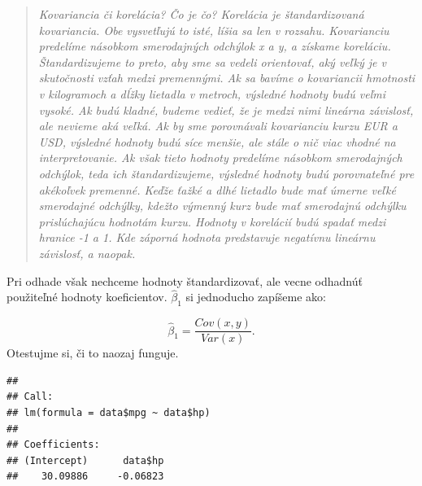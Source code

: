 \begin{quote}
\emph{Kovariancia či korelácia? Čo je čo? Korelácia je štandardizovaná
kovariancia. Obe vysvetľujú to isté, líšia sa len v rozsahu. Kovarianciu
predelíme násobkom smerodajných odchýlok x a y, a získame koreláciu.
Štandardizujeme to preto, aby sme sa vedeli orientovať, aký veľký je v
skutočnosti vzťah medzi premennými. Ak sa bavíme o kovariancii hmotnosti
v kilogramoch a dĺžky lietadla v metroch, výsledné hodnoty budú veľmi
vysoké. Ak budú kladné, budeme vedieť, že je medzi nimi lineárna
závislosť, ale nevieme aká veľká. Ak by sme porovnávali kovarianciu
kurzu EUR a USD, výsledné hodnoty budú síce menšie, ale stále o nič viac
vhodné na interpretovanie. Ak však tieto hodnoty predelíme násobkom
smerodajných odchýlok, teda ich štandardizujeme, výsledné hodnoty budú
porovnateľné pre akékoľvek premenné. Keďže ťažké a dlhé lietadlo bude
mať úmerne veľké smerodajné odchýlky, kdežto výmenný kurz bude mať
smerodajnú odchýlku prislúchajúcu hodnotám kurzu. Hodnoty v korelácií
budú spadať medzi hranice -1 a 1. Kde záporná hodnota predstavuje
negatívnu lineárnu závislosť, a naopak.}
\end{quote}

Pri odhade však nechceme hodnoty štandardizovať, ale vecne odhadnúť
použiteľné hodnoty koeficientov. \(\hat\beta_1\) si jednoducho zapíšeme
ako:

\[\hat\beta_1 = \frac{Cov(x, y)}{Var(x)}.\] Otestujme si, či to naozaj
funguje.

\begin{Shaded}
\begin{Highlighting}[]
\end{Highlighting}
\end{Shaded}

\begin{verbatim}
## 
## Call:
## lm(formula = data$mpg ~ data$hp)
## 
## Coefficients:
## (Intercept)      data$hp  
##    30.09886     -0.06823
\end{verbatim}

\begin{Shaded}
\begin{Highlighting}[]
\StringTok{ }\OperatorTok{$}\OperatorTok{$}

\StringTok{ }\OperatorTok{$}

\StringTok{ }\OperatorTok{/}

\end{Highlighting}
\end{Shaded}

